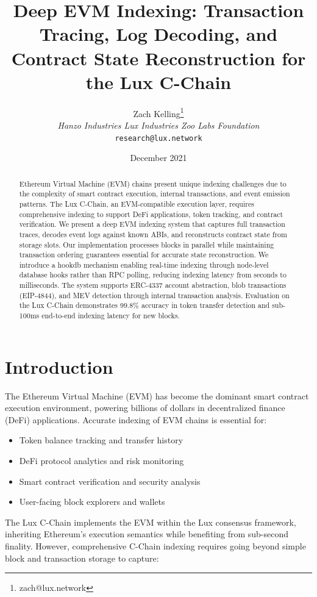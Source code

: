 \documentclass[11pt,twocolumn]{article}
\title{Deep EVM Indexing: Transaction Tracing, Log Decoding, and Contract State Reconstruction for the Lux C-Chain}
\author{Zach Kelling\thanks{zach@lux.network} \\ \textit{Hanzo Industries \quad Lux Industries \quad Zoo Labs Foundation} \\ \texttt{research@lux.network}}
\date{December 2021}
\begin{document}
\maketitle

\begin{abstract}
Ethereum Virtual Machine (EVM) chains present unique indexing challenges due to the complexity of smart contract execution, internal transactions, and event emission patterns. The Lux C-Chain, an EVM-compatible execution layer, requires comprehensive indexing to support DeFi applications, token tracking, and contract verification. We present a deep EVM indexing system that captures full transaction traces, decodes event logs against known ABIs, and reconstructs contract state from storage slots. Our implementation processes blocks in parallel while maintaining transaction ordering guarantees essential for accurate state reconstruction. We introduce a hookdb mechanism enabling real-time indexing through node-level database hooks rather than RPC polling, reducing indexing latency from seconds to milliseconds. The system supports ERC-4337 account abstraction, blob transactions (EIP-4844), and MEV detection through internal transaction analysis. Evaluation on the Lux C-Chain demonstrates 99.8\% accuracy in token transfer detection and sub-100ms end-to-end indexing latency for new blocks.
\end{abstract}

\section{Introduction}

The Ethereum Virtual Machine (EVM) has become the dominant smart contract execution environment, powering billions of dollars in decentralized finance (DeFi) applications. Accurate indexing of EVM chains is essential for:

\begin{itemize}
\item Token balance tracking and transfer history
\item DeFi protocol analytics and risk monitoring
\item Smart contract verification and security analysis
\item User-facing block explorers and wallets
\end{itemize}

The Lux C-Chain implements the EVM within the Lux consensus framework, inheriting Ethereum's execution semantics while benefiting from sub-second finality. However, comprehensive C-Chain indexing requires going beyond simple block and transaction storage to capture:
\end{document}
